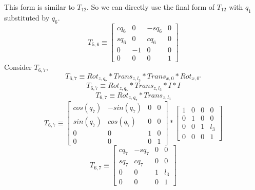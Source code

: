 \documentclass[12pt]{article}
\newcommand{\rz}[1]{\begin{bmatrix} cos(#1) & -sin(#1) & 0 & 0 \\ sin(#1) & cos(#1) & 0 & 0 \\ 0 & 0 & 1 & 0 \\ 0 & 0 & 0 & 1 \end{bmatrix}}
\newcommand{\trans}[3]{\begin{bmatrix} 1 & 0 & 0 & #1 \\ 0 & 1 & 0 & #2 \\ 0 & 0 & 1 & #3 \\ 0 & 0 & 0 & 1 \end{bmatrix}}
\begin{document}
This form is similar to $T_{12}$. So we can directly use the final form of $T_{12}$ with $q_1$ substituted by $q_6$.
\[
  T_{5,6} \equiv
  \begin{bmatrix} cq_6 & 0 & -sq_6 & 0 \\ sq_6 & 0 & cq_6 & 0 \\ 0 & -1 & 0 & 0 \\ 0 & 0 & 0 & 1 \end{bmatrix}
\]
Consider $T_{6,7}$,
\[
  T_{6,7} \equiv Rot_{z,q_7} * Trans_{z, l_3} * Trans_{x, 0} * Rot_{x, 0^{\circ}}
\]
\[
  T_{6,7} \equiv Rot_{z,q_7} * Trans_{z, l_3} * I * I
\]
\[
  T_{6,7} \equiv Rot_{z,q_7} * Trans_{z, l_3}
\]
\[
  T_{6,7} \equiv \rz{q_7} * \trans{0}{0}{l_3}
\]
\[
  T_{6,7} \equiv
  \begin{bmatrix} cq_7 & -sq_7 & 0 & 0 \\ sq_7 & cq_7 & 0 & 0 \\ 0 & 0 & 1 & l_3 \\ 0 & 0 & 0 & 1 \end{bmatrix}
\]
\end{document}
